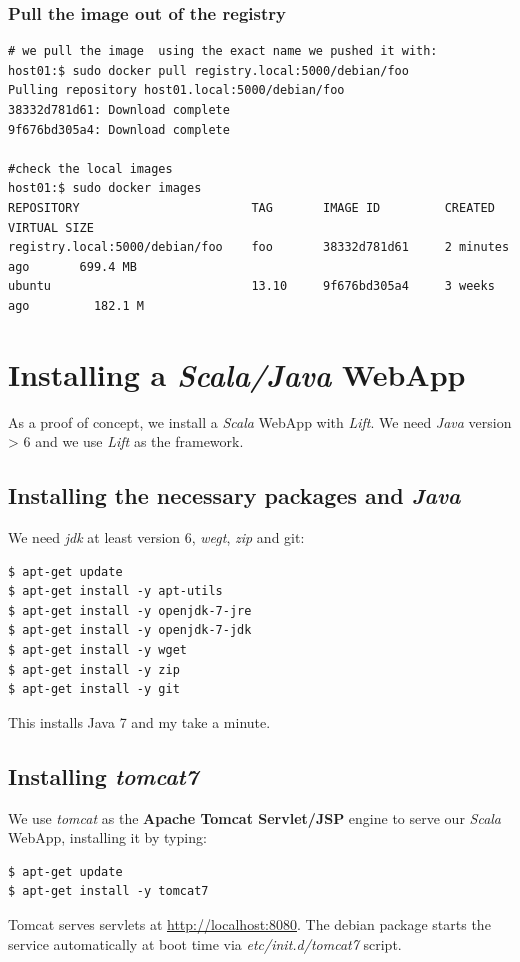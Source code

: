 \documentclass[captions=tableheading]{article}
\begin{document}
\subsubsection{Pull the image out of the registry}
\label{sec-3-7-4}


\begin{verbatim}
# we pull the image  using the exact name we pushed it with:
host01:$ sudo docker pull registry.local:5000/debian/foo
Pulling repository host01.local:5000/debian/foo
38332d781d61: Download complete 
9f676bd305a4: Download complete

#check the local images
host01:$ sudo docker images
REPOSITORY                        TAG       IMAGE ID         CREATED             VIRTUAL SIZE
registry.local:5000/debian/foo    foo       38332d781d61     2 minutes ago       699.4 MB
ubuntu                            13.10     9f676bd305a4     3 weeks ago         182.1 M
\end{verbatim}
\section{Installing a \emph{Scala/Java} WebApp}
\label{sec-4}

As a proof of concept, we install a \emph{Scala} WebApp with \emph{Lift}. We need \emph{Java} version > 6 and we use \emph{Lift} as the framework. 
\subsection{Installing the necessary packages and \emph{Java}}
\label{sec-4-1}

We need \emph{jdk} at least version 6, \emph{wegt}, \emph{zip} and git:

\begin{verbatim}
$ apt-get update
$ apt-get install -y apt-utils
$ apt-get install -y openjdk-7-jre
$ apt-get install -y openjdk-7-jdk
$ apt-get install -y wget
$ apt-get install -y zip
$ apt-get install -y git
\end{verbatim}
This installs Java 7 and my take a minute.
\subsection{Installing \emph{tomcat7}}
\label{sec-4-2}

We use \emph{tomcat} as the \textbf{Apache Tomcat Servlet/JSP} engine to serve our \emph{Scala} WebApp, installing it by typing:

\begin{verbatim}
$ apt-get update
$ apt-get install -y tomcat7
\end{verbatim}
Tomcat serves servlets  at \href{http://localhost:8080}{http://localhost:8080}. The debian package starts the service automatically at boot time via \emph{etc/init.d/tomcat7} script.
\end{document}
